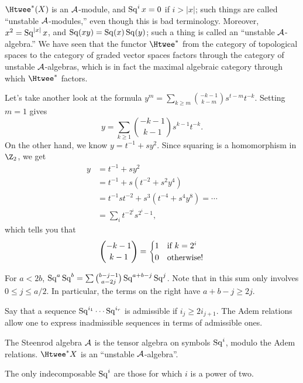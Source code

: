 $\Htwee^* (X)$ is an $\mathcal{A}$-module, and $\operatorname{Sq}^i x = 0$ if $i > |x|$; such things are called ``unstable $\mathcal{A}$-modules,'' even though this is bad terminology.  Moreover, $x^2 = \operatorname{Sq}^{|x|} x$, and $\operatorname{Sq}(xy) = \operatorname{Sq}(x) \operatorname{Sq}(y)$; such a thing is called an ``unstable $\mathcal{A}$-algebra.''  %
We have seen that the functor $\Htwee^*$ from the category of topological spaces to the category of graded vector spaces factors through the category of unstable $\mathcal{A}$-algebras, which is in fact
%
the maximal algebraic category through which $\Htwee^*$ factors. %

Let's take another look at the formula $y^m = \sum_{k \ge m} \binom{-k-1}{k-m} s^{t-m} t^{-k}$.  Setting $m=1$ gives \[y = \sum_{k \ge 1} \binom{-k-1}{k-1} s^{k-1} t^{-k}.\]  On the other hand, we know $y = t^{-1} + sy^2$.  Since squaring is a homomorphism in $\Z_2$, we get
\begin{align*}
y & = t^{-1} + sy^2 \\
& = t^{-1} + s(t^{-2} + s^2 y^4) \\
& = t^{-1} st^{-2} + s^3(t^{-4} + s^4y^8) = \cdots \\
& = \sum_i t^{-2^i} s^{2^i-1},
\end{align*}
which tells you that
\[
\binom{-k-1}{k-1} = \begin{cases} 1 & \hbox{if $k = 2^i$} \\ 0 & \hbox{otherwise!} \end{cases}
\]

\fi
\begin{SummaryNote}
\Bullet For $a<2b$, $\operatorname{Sq}^a\operatorname{Sq}^b=\sum\binom{b-j-1}{a-2j}\operatorname{Sq}^{a+b-j}\operatorname{Sq}^j$. Note that in this sum only involves $0\leq j\leq a/2$. In particular, the terms on the right have $a+b-j\geq 2j$.

\Bullet Say that a sequence $\operatorname{Sq}^{i_1}\cdots \operatorname{Sq}^{i_r}$ is admissible if $i_j\geq2i_{j+1}$. The Adem relations allow one to express inadmissible sequences in terms of admissible ones.

\Bullet The Steenrod algebra $\mathcal{A}$ is the tensor algebra on symbols $\operatorname{Sq}^i$, modulo the Adem relations. $\Htwee^*X$ is an ``unstable $\mathcal{A}$-algebra''.

\Bullet The only indecomposable $\operatorname{Sq}^i$ are those for which $i$ is a power of two.
\end{SummaryNote}

